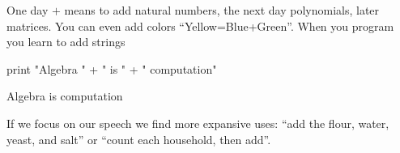 
One day  $+$ means to add natural numbers, the next day 
polynomials, later matrices.  
You can even add colors ``Yellow=Blue+Green''. When you program 
you learn to add strings
\begin{center}
\begin{notebookin}
print "Algebra " + " is " + " computation"
\end{notebookin}
\begin{notebookout}
Algebra is computation
\end{notebookout}
\end{center}
If we focus on our 
speech we find more expansive uses:
``add the flour, water, yeast, and salt'' or  
``count each household, then add''.

